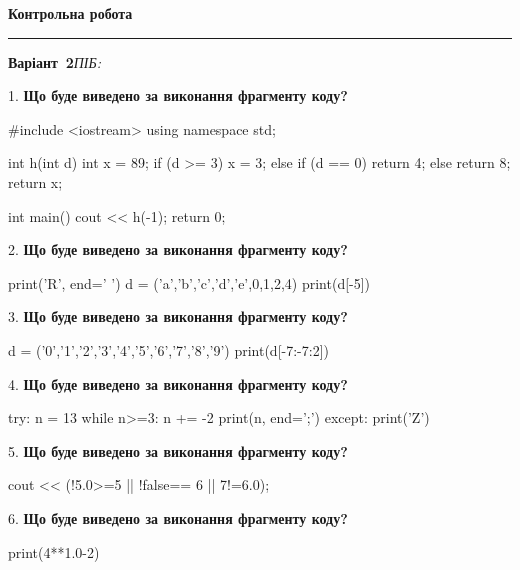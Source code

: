 \documentclass[11pt]{article}
\begin{document}
{\centering\Large\bfseries Контрольна робота\par}
\medskip
\noindent\rule{\linewidth}{0.5pt}
\smallskip
\noindent\textbf{Варіант \No\,2}\hfill \textit{ПІБ:}\,\underline{\hspace{60mm}}
\vspace{4mm}

1. \textbf{Що буде виведено за виконання фрагменту коду?}

#include <iostream>
using namespace std;

int h(int d){
    int x = 89;
    if (d >= 3) 
        x = 3;
    else if (d == 0)
         return 4;
    else
         return 8;
    return x;
}

int main(){
    cout << h(-1);
    return 0;
}

\par\vspace{5mm}

2. \textbf{Що буде виведено за виконання фрагменту коду?}

print('R', end=' ')
d = ('a','b','c','d','e',0,1,2,4)
print(d[-5])

\par\vspace{5mm}

3. \textbf{Що буде виведено за виконання фрагменту коду?}

d = ('0','1','2','3','4','5','6','7','8','9')
print(d[-7:-7:2])

\par\vspace{5mm}

4. \textbf{Що буде виведено за виконання фрагменту коду?}

try:
    n = 13
    while n>=3:
        n += -2
    print(n, end=';')
except:
    print('Z')

\par\vspace{5mm}

5. \textbf{Що буде виведено за виконання фрагменту коду?}

cout << (!5.0>=5 || !false== 6 || 7!=6.0);
\par\vspace{5mm}

6. \textbf{Що буде виведено за виконання фрагменту коду?}

print(4**1.0-2)
\par\vspace{5mm}
\end{document}
